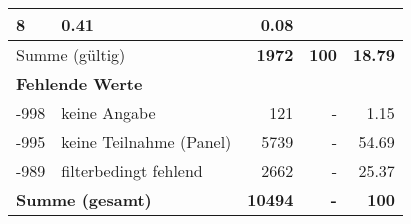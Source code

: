\begin{longtable}{lXrrr}
       \num{8} &
       \num[round-mode=places,round-precision=2]{0.41} &
         \num[round-mode=places,round-precision=2]{0.08} \\
     \midrule
     \multicolumn{2}{l}{Summe (gültig)} &
       \textbf{\num{1972}} &
     \textbf{\num{100}} &
       \textbf{\num[round-mode=places,round-precision=2]{18.79}} \\
     \multicolumn{5}{l}{\textbf{Fehlende Werte}}\\
       -998 &
       keine Angabe &
         \num{121} &
        - &
         \num[round-mode=places,round-precision=2]{1.15} \\
       -995 &
       keine Teilnahme (Panel) &
         \num{5739} &
        - &
         \num[round-mode=places,round-precision=2]{54.69} \\
       -989 &
       filterbedingt fehlend &
         \num{2662} &
        - &
         \num[round-mode=places,round-precision=2]{25.37} \\
     \midrule
     \multicolumn{2}{l}{\textbf{Summe (gesamt)}} &
          \textbf{\num{10494}} &
        \textbf{-} &
        \textbf{\num{100}} \\
     \bottomrule
     \end{longtable}
     
